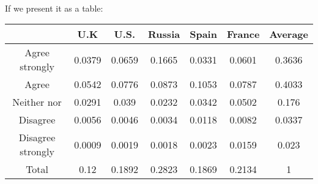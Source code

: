 \documentclass[12pt]{extarticle}
\numberwithin{equation}{section}
\begin{document}
\\
If we present it as a table: 
 \begin{table}[h]
    \centering
    \begin{tabular}{c c c c c c c }
    \hline
    \hspace{1pt} & U.K   & U.S. & Russia & Spain & France & Average \\ \hline
       Agree strongly  &0.0379 & 0.0659 &  0.1665 & 0.0331 & 0.0601 & 0.3636 \\
       Agree  & 0.0542 & 0.0776 &  0.0873 & 0.1053 & 0.0787 & 0.4033\\
       Neither nor &0.0291 & 0.039 & 0.0232 & 0.0342 & 0.0502 & 0.176\\
       Disagree &0.0056 & 0.0046 & 0.0034 & 0.0118 & 0.0082 & 0.0337 \\
       Disagree strongly &0.0009 & 0.0019 & 0.0018 & 0.0023 & 0.0159 & 0.023  \\
       Total & 0.12 & 0.1892 & 0.2823 & 0.1869 & 0.2134  &1 \\
       \hline
    \end{tabular}
    \label{Table 1.2}
\end{table}
\end{document}
